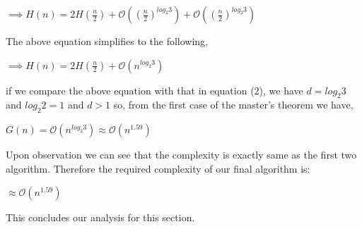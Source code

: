 \documentclass[12pt,a4paper]{article}%
\begin{document}
\begin{itemize}
{\begin{flushleft}
  	  		\begin{center}
  	  			$\implies H(n) = 2H(\frac{n}{2}) + \mathcal{O}({(\frac{n}{2})}^{log_2 {3}}) + \mathcal{O}({(\frac{n}{2})}^{log_2 {3}})$
  	  		\end{center}
    		The above equation simplifies to the following,
  	  		\begin{center}
  	  			$\implies H(n) = 2H(\frac{n}{2}) + \mathcal{O}({n}^{log_2 {3}})$
  	  		\end{center}
  	  		
  	  		if we compare the above equation with that in equation ($2$), we have $d=log_2 {3}$ and $log_2 {2}=1$ and $d>1$ so, from the first case of the master's theorem we have,\\
  	  		\begin{center}
  	  			$G(n)=\mathcal{O}(n^{log_2 {3}})\approx \mathcal{O}(n^{1.59})$
  	  		\end{center}
  	  		Upon observation we can see that the complexity is exactly same as the first two algorithm. Therefore the required complexity of our final algorithm is:\\
  	  		\begin{center}
  	  			$\boxed{\approx \mathcal{O}(n^{1.59})}$
  	  		\end{center}
    		This concludes our analysis for this section.
  	  	\end{flushleft}
  	  }
	\end{itemize}
\end{document}
